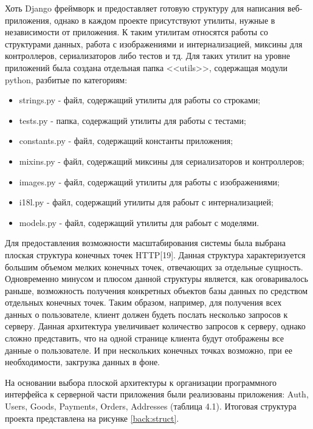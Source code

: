 Хоть Django фреймворк и предоставляет готовую структуру для написания веб-приложения, однако в каждом проекте присутствуют утилиты, нужные в независимости от приложения.
К таким утилитам относятся работы со структурами данных, работа с изображениями и интернализацией, миксины для контроллеров, сериализаторов либо тестов и тд.
Для таких утилит на уровне приложений была создана отдельная папка <<utils>>, содержащая модули python, разбитые по категориям:
\begin{itemize}
    \item strings.py - файл, содержащий утилиты для работы со строками;
    \item tests.py - папка, содержащий утилиты для работы с тестами;
    \item constants.py - файл, содержащий константы приложения;
    \item mixins.py - файл, содержащий миксины для сериализаторов и контроллеров;
    \item images.py - файл, содержащий утилиты для работы с изображениями;
    \item i18l.py - файл, содержащий утилиты для рабоыт с интернализацией;
    \item models.py - файл, содержащий утилиты для рабоыт с моделями.
\end{itemize}

Для предоставления возможности масштабирования системы была выбрана плоская структура конечных точек HTTP[19].
Данная структура характеризуется большим объемом мелких конечных точек, отвечающих за отдельные сущность.
Одновременно минусом и плюсом данной структуры является, как оговаривалось раньше, возможность получения конкретных объектов базы данных по средством отдельных конечных точек.
Таким образом, например, для получения всех данных о пользователе, клиент должен будеть послать несколько запросов к серверу.
Данная архитектура увеличивает количество запросов к серверу, однако сложно представить, что на одной странице клиента будут отображены все данные о пользователе.
И при нескольких конечных точках возможно, при ее необходимости, закгрузка данных в фоне.

На основании выбора плоской архитектуры к организации программного интерфейса к серверной части приложения были реализованы приложения: Auth, Users, Goods, Payments, Orders, Addresses (таблица 4.1).
Итоговая структура проекта представлена на рисунке \ref{back:struct}.

